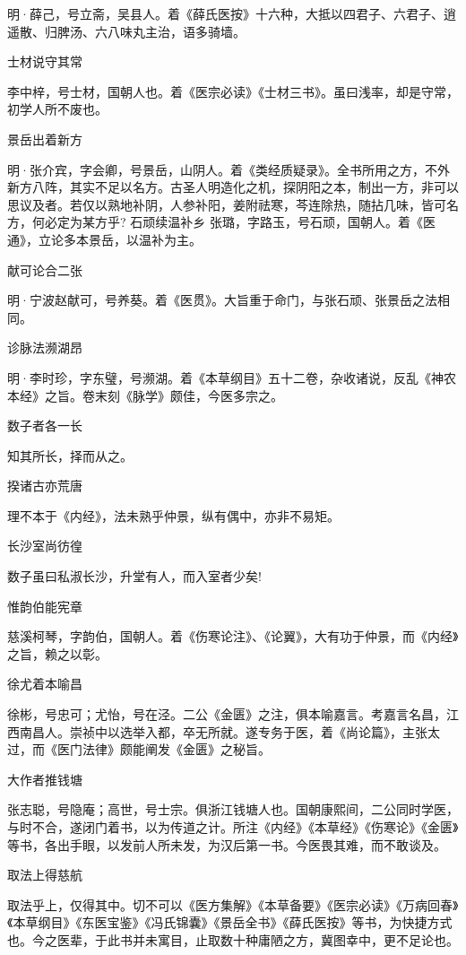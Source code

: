 \documentclass[a4paper,12pt,UTF8,twoside]{ctexbook}
\begin{document}
	明·薛己，号立斋，吴县人。着《薛氏医按》十六种，大抵以四君子、六君子、逍遥散、归脾汤、六八味丸主治，语多骑墙。
	
	士材说守其常
	
	李中梓，号士材，国朝人也。着《医宗必读》《士材三书》。虽曰浅率，却是守常，初学人所不废也。
	
	景岳出着新方
	
	明·张介宾，字会卿，号景岳，山阴人。着《类经质疑录》。全书所用之方，不外新方八阵，其实不足以名方。古圣人明造化之机，探阴阳之本，制出一方，非可以思议及者。若仅以熟地补阴，人参补阳，姜附祛寒，芩连除热，随拈几味，皆可名方，何必定为某方乎?
	石顽续温补乡
	张璐，字路玉，号石顽，国朝人。着《医通》，立论多本景岳，以温补为主。
	
	献可论合二张
	
	明·宁波赵献可，号养葵。着《医贯》。大旨重于命门，与张石顽、张景岳之法相同。
	
	诊脉法濒湖昂
	
	明·李时珍，字东璧，号濒湖。着《本草纲目》五十二卷，杂收诸说，反乱《神农本经》之旨。卷末刻《脉学》颇佳，今医多宗之。
	
	数子者各一长
	
	知其所长，择而从之。
	
	揆诸古亦荒唐
	
	理不本于《内经》，法未熟乎仲景，纵有偶中，亦非不易矩。
	
	长沙室尚彷徨
	
	数子虽曰私淑长沙，升堂有人，而入室者少矣!
	
	惟韵伯能宪章
	
	慈溪柯琴，字韵伯，国朝人。着《伤寒论注》、《论翼》，大有功于仲景，而《内经》之旨，赖之以彰。
	
	徐尤着本喻昌
	
	徐彬，号忠可；尤怡，号在泾。二公《金匮》之注，俱本喻嘉言。考嘉言名昌，江西南昌人。崇祯中以选举入都，卒无所就。遂专务于医，着《尚论篇》，主张太过，而《医门法律》颇能阐发《金匮》之秘旨。
	
	大作者推钱塘
	
	张志聪，号隐庵；高世，号士宗。俱浙江钱塘人也。国朝康熙间，二公同时学医，与时不合，遂闭门着书，以为传道之计。所注《内经》《本草经》《伤寒论》《金匮》等书，各出手眼，以发前人所未发，为汉后第一书。今医畏其难，而不敢谈及。
	
	取法上得慈航
	
	取法乎上，仅得其中。切不可以《医方集解》《本草备要》《医宗必读》《万病回春》《本草纲目》《东医宝鉴》《冯氏锦囊》《景岳全书》《薛氏医按》等书，为快捷方式也。今之医辈，于此书并未寓目，止取数十种庸陋之方，冀图幸中，更不足论也。
	
\end{document}
